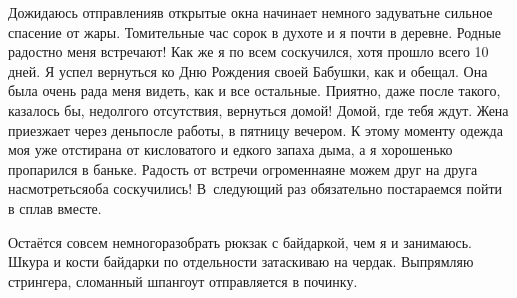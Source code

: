 Дожидаюсь отправления\mdash в открытые окна начинает немного задувать\mdash не сильное спасение от жары. Томительные час сорок в духоте и я почти в деревне. Родные радостно меня встречают! Как же я по всем соскучился, хотя прошло всего 10 дней. Я успел вернуться ко Дню Рождения своей Бабушки, как и обещал. Она была очень рада меня видеть, как и все остальные. Приятно, даже после такого, казалось бы, недолгого отсутствия, вернуться домой! Домой, где тебя ждут. Жена приезжает через день\mdash после работы, в пятницу вечером. К этому моменту одежда моя уже отстирана от кисловатого и едкого запаха дыма, а я хорошенько пропарился в баньке. Радость от встречи огроменная\mdash не можем друг на друга насмотреться\mdash оба соскучились! В~следующий раз обязательно постараемся пойти в сплав вместе. 

Остаётся совсем немного\mdash разобрать рюкзак с байдаркой, чем я и занимаюсь. Шкура и кости байдарки по отдельности затаскиваю на чердак. Выпрямляю стрингера, сломанный шпангоут отправляется в починку. 

\begin{center}
\end{center}